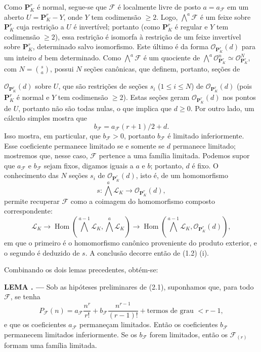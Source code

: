 \documentclass[11pt,twoside,openany]{book}
\numberwithin{equation}{section}
\newcommand{\src}[1]{%
  \phantomsection\hypertarget{src:#1}{}%
  \marginpar{\raggedleft\footnotesize\sffamily #1}%
}
\theoremstyle{plain}
\theoremstyle{definition}
\theoremstyle{remark}
\newcommand{\result}[2]{%
  \par\medskip\noindent\textbf{#1%
  \if\relax\detokenize{#2}\relax\else\space#2\fi. ---}\enspace
}
\newcommand{\FgaUnitKey}{frontmatter}
\renewcommand{\src}[1]{%
  \phantomsection\hypertarget{src:\FgaUnitKey:#1}{}%
  \marginpar{\raggedleft\footnotesize\sffamily #1}%
}
\begin{document}
Como $\mathbf P^r_K$ é normal, segue-se que $\mathcal F$ é localmente livre de
posto $a=a_{\mathcal F}$ em um aberto $U=\mathbf P^r_K-Y$, onde $Y$ tem
codimensão $\geq2$. Logo, $\bigwedge^a\mathcal F$ é um feixe sobre
$\mathbf P^r_K$ cuja restrição a $U$ é invertível; portanto (como
$\mathbf P^r_K$ é regular e $Y$ tem codimensão $\geq2$), essa restrição é
isomorfa à restrição de um feixe invertível sobre $\mathbf P^r_K$, determinado
salvo isomorfismo. Este último é da forma $\mathcal O_{\mathbf P^r_K}(d)$ para um
inteiro $d$ bem determinado. Como $\bigwedge^a\mathcal F$ é um quociente de
$\bigwedge^a\mathcal O_{\mathbf P^r_K}^{n}\simeq
\mathcal O_{\mathbf P^r_K}^{N}$, com $N=\binom{s}{a}$, possui $N$ seções canônicas,
que definem, portanto, seções de
\src{257}
$\mathcal O_{\mathbf P^r_K}(d)$ sobre $U$, que são restrições de seções
$s_i$ ($1\leq i\leq N$) de $\mathcal O_{\mathbf P^r_K}(d)$ (pois
$\mathbf P^r_K$ é normal e $Y$ tem codimensão $\geq2$). Estas seções
geram $\mathcal O_{\mathbf P^r_K}(d)$ nos pontos de $U$, portanto não são
todas nulas, o que implica que $d\geq0$. Por outro lado, um cálculo simples
mostra que
\[
b_{\mathcal F}=a_{\mathcal F}(r+1)/2+d.
\]
Isso mostra, em particular, que $b_{\mathcal F}>0$, portanto
$b_{\mathcal F}$ é limitado inferiormente. Esse coeficiente permanece limitado
se e somente se $d$ permanece limitado; mostremos que, nesse caso, $\mathcal F$
pertence a uma família limitada. Podemos supor que $a_{\mathcal F}$ e
$b_{\mathcal F}$ sejam fixos, digamos iguais a $a$ e $b$; portanto, $d$ é fixo.
O conhecimento das $N$ seções
$s_i$ de $\mathcal O_{\mathbf P^r_K}(d)$, isto é, de um homomorfismo
\[
s:\bigwedge^a\mathcal L_K\longrightarrow\mathcal O_{\mathbf P^r_K}(d),
\]
permite recuperar $\mathcal F$ como a coimagem do homomorfismo composto
correspondente:
\[
\mathcal L_K\longrightarrow
\operatorname{Hom}\!\left(\bigwedge^{a-1}\mathcal L_K,
\bigwedge^a\mathcal L_K\right)\longrightarrow
\operatorname{Hom}\!\left(\bigwedge^{a-1}\mathcal L_K,
\mathcal O_{\mathbf P^r_K}(d)\right),
\]
em que o primeiro é o homomorfismo canônico proveniente do produto exterior, e
o segundo é deduzido de $s$. A conclusão decorre então de (1.2) (i).

Combinando os dois lemas precedentes, obtém-se:

\result{LEMA}{2.6} Sob as hipóteses preliminares de (2.1), suponhamos que, para
todo $\mathcal F$, se tenha
\[
P_{\mathcal F}(n)=a_{\mathcal F}\frac{n^r}{r!}
+b_{\mathcal F}\frac{n^{r-1}}{(r-1)!}
+\text{termos de grau $<r-1$},
\]
e que os coeficientes $a_{\mathcal F}$ permaneçam limitados. Então os
coeficientes $b_{\mathcal F}$ permanecem limitados inferiormente. Se os
$b_{\mathcal F}$ forem limitados, então os $\mathcal F_{(r)}$ formam uma família
limitada.
\end{document}
